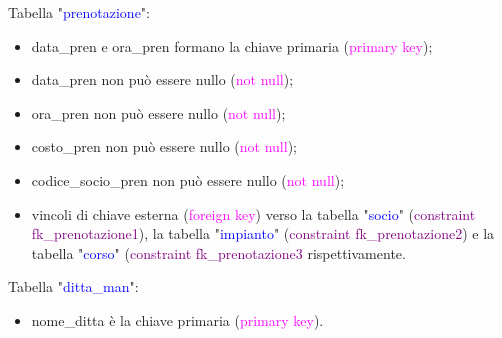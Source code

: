 \documentclass{article}
\begin{document}
    \begin{flushleft}
        Tabella "\textcolor{blue}{prenotazione}": \\
        \begin{itemize}
            \item data\_pren e ora\_pren formano la chiave primaria (\textcolor{magenta}{primary key}); \\
            \item data\_pren non può essere nullo (\textcolor{magenta}{not null}); \\
            \item ora\_pren non può essere nullo (\textcolor{magenta}{not null}); \\
            \item costo\_pren non può essere nullo (\textcolor{magenta}{not null}); \\
            \item codice\_socio\_pren non può essere nullo (\textcolor{magenta}{not null}); \\
            \item vincoli di chiave esterna (\textcolor{magenta}{foreign key}) verso la tabella "\textcolor{blue}{socio}" (\textcolor{purple}{constraint fk\_prenotazione1}), la tabella "\textcolor{blue}{impianto}" (\textcolor{purple}{constraint fk\_prenotazione2}) e la tabella "\textcolor{blue}{corso}" (\textcolor{purple}{constraint fk\_prenotazione3} rispettivamente. \\
        \end{itemize}        
    \end{flushleft}

    \begin{flushleft}
        Tabella "\textcolor{blue}{ditta\_man}": \\
        \begin{itemize}
            \item nome\_ditta è la chiave primaria (\textcolor{magenta}{primary key}). \\
        \end{itemize}        
    \end{flushleft}
\end{document}
